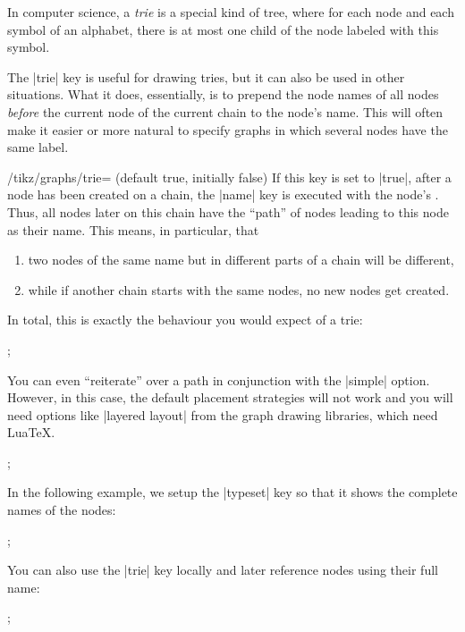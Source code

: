 In computer science, a \emph{trie} is a special kind of tree, where
for each node and each symbol of an alphabet, there is at most one
child of the node labeled with this symbol.

The |trie| key is useful for drawing tries, but it can also be used in
other situations. What it does, essentially, is to prepend the node
names of all nodes \emph{before} the current node of the current chain
to the node's name. This will often make it easier or more natural to
specify graphs in which several nodes have the same label. 

\begin{key}{/tikz/graphs/trie= (default true, initially false)}
  If this key is set to |true|, after a node has been created on a
  chain, the |name| key is executed with the node's . Thus, all nodes later on this chain have the ``path'' of
  nodes leading to this node as their name. This means, in particular,
  that
  \begin{enumerate}
  \item two nodes of the same name but in different parts of a chain
    will be different,
  \item while if another chain starts with the same nodes, no new
    nodes get created.
  \end{enumerate}
  In total, this is exactly the behaviour you would expect of a trie:
\begin{codeexample}[]
\tikz {};
\end{codeexample}
  You can even ``reiterate'' over a path in conjunction with the
  |simple| option. However, in this case, the default placement
  strategies will not work and you will need options like
  |layered layout| from the graph drawing libraries, which need
  Lua\TeX. 
\ifluatex  
\begin{codeexample}[]
\tikz {};
\end{codeexample}
  In the following example, we setup the |typeset| key so that it
  shows the complete names of the nodes:
\begin{codeexample}[]
\tikz {};
\end{codeexample}
\fi
  You can also use the |trie| key locally and later reference nodes
  using their full name:
\begin{codeexample}[]
\tikz {};
\end{codeexample}
\end{key}


